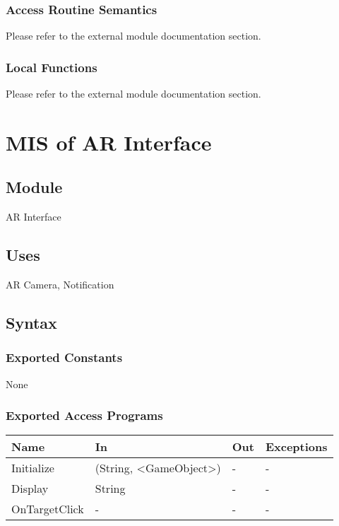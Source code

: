 \documentclass[12pt, titlepage]{article}
\begin{document}
\subsubsection{Access Routine Semantics}

Please refer to the external module documentation section.

\subsubsection{Local Functions}

Please refer to the external module documentation section.

\newpage

\section{MIS of AR Interface} \label{mARInterface}

\subsection{Module}

AR Interface

\subsection{Uses}

AR Camera, Notification

\subsection{Syntax}

\subsubsection{Exported Constants}

None

\subsubsection{Exported Access Programs}

\begin{center}
\begin{tabular}{p{3cm} p{5cm} p{2cm} p{3cm}}
\hline
\textbf{Name} & \textbf{In} & \textbf{Out} & \textbf{Exceptions} \\
\hline
Initialize & (String, \textless GameObject\textgreater) & - & -\\
Display & String & - & -\\
OnTargetClick & - & - & - \\

\hline
\end{tabular}
\end{center}
\end{document}
